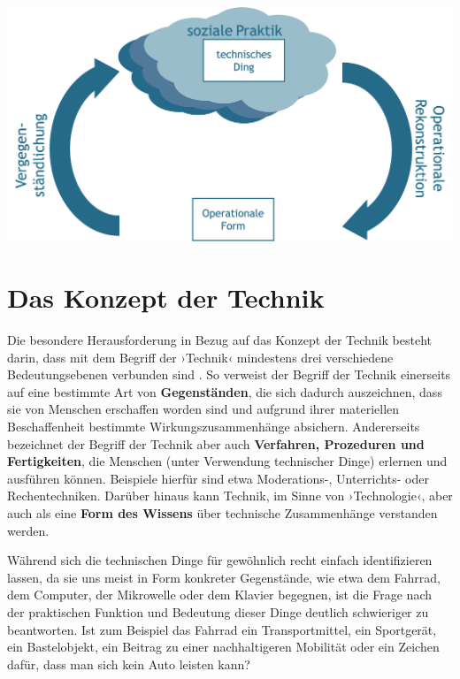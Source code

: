 \documentclass[
  a4paper,
]{book}
\begin{document}
\begin{center}\includegraphics{Figures/05-01-SozialePraktik} \end{center}

\section{Das Konzept der Technik}\label{das-konzept-der-technik}

Die besondere Herausforderung in Bezug auf das Konzept der Technik besteht darin, dass mit dem Begriff der ›Technik‹ mindestens drei verschiedene Bedeutungsebenen verbunden sind \citep{mitchamThinkingTechnologyPath1994, horningExpertenAlltags2001}. So verweist der Begriff der Technik einerseits auf eine bestimmte Art von \textbf{Gegenständen}, die sich dadurch auszeichnen, dass sie von Menschen erschaffen worden sind und aufgrund ihrer materiellen Beschaffenheit bestimmte Wirkungszusammenhänge absichern. Andererseits bezeichnet der Begriff der Technik aber auch \textbf{Verfahren, Prozeduren und Fertigkeiten}, die Menschen (unter Verwendung technischer Dinge) erlernen und ausführen können. Beispiele hierfür sind etwa Moderations-, Unterrichts- oder Rechentechniken. Darüber hinaus kann Technik, im Sinne von ›Technologie‹, aber auch als eine \textbf{Form des Wissens} über technische Zusammenhänge verstanden werden.

Während sich die technischen Dinge für gewöhnlich recht einfach identifizieren lassen, da sie uns meist in Form konkreter Gegenstände, wie etwa dem Fahrrad, dem Computer, der Mikrowelle oder dem Klavier begegnen, ist die Frage nach der praktischen Funktion und Bedeutung dieser Dinge deutlich schwieriger zu beantworten. Ist zum Beispiel das Fahrrad ein Transportmittel, ein Sportgerät, ein Bastelobjekt, ein Beitrag zu einer nachhaltigeren Mobilität oder ein Zeichen dafür, dass man sich kein Auto leisten kann?
\end{document}
